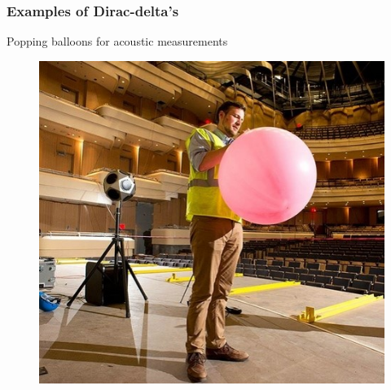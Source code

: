 \begin{frame}
	\frametitle{Examples of Dirac-delta’s}
	Popping balloons for acoustic measurements
	\begin{figure}
		\centering
		\includegraphics[height=0.7\textheight]{Images/discrete_time_systems_9}
	\end{figure}

\end{frame}
